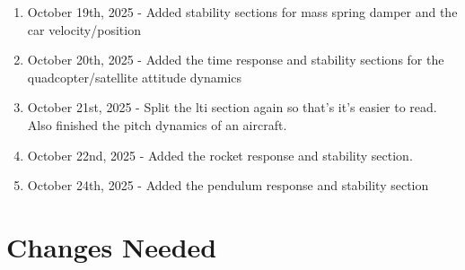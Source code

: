 \begin{enumerate}[itemsep=-5pt]
\item October 19th, 2025 - Added stability sections for mass spring damper and the car velocity/position
\item October 20th, 2025 - Added the time response and stability sections for the quadcopter/satellite attitude dynamics
\item October 21st, 2025 - Split the lti section again so that's it's easier to read. Also finished the pitch dynamics of an aircraft.
\item October 22nd, 2025 - Added the rocket response and stability section.
\item October 24th, 2025 - Added the pendulum response and stability section
\end{enumerate}

\section*{Changes Needed}

